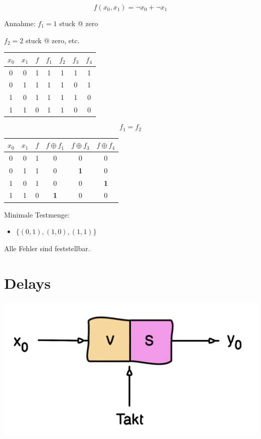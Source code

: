 \documentclass[a4paper,6pt]{article}
\begin{document}
\begin{multicols*}{3}
$$
f(x_0, x_1) = \neg x_0 + \neg x_1
$$

Annahme: \quad $f_{1} = 1$ stuck @ zero

\qquad \qquad \qquad $f_{2} = 2$ stuck @ zero, etc. 

\tiny
    \begin{center}
        \begin{tabular}{cc|c|cccc}
            \hline
            $x_0$ & $x_1$ & $f$ & $f_{1}$ & $f_{2}$ & $f_{3}$ & $f_{4}$  \\
            \hline
            0 & 0 & 1 & 1 & 1 & 1 & 1 \\
            0 & 1 & 1 & 1 & 1 & 0 & 1 \\
            1 & 0 & 1 & 1 & 1 & 1 & 0 \\
            1 & 1 & 0 & 1 & 1 & 0 & 0 \\
            \hline
        \end{tabular}
    \end{center}    
\scriptsize

$$
f_1 = f_2
$$

\tiny
    \begin{center}
        \begin{tabular}{cc|c|ccc}
            \hline
            $x_0$ & $x_1$ & $f$ & $f \oplus f_{1}$ & $f \oplus f_{3}$ & $f \oplus f_{4}$ \\
            \hline
            0 & 0 & 1 & 0 & 0 & 0 \\
            0 & 1 & 1 & 0 & \textbf{1} & 0 \\
            1 & 0 & 1 & 0 & 0 & \textbf{1} \\
            1 & 1 & 0 & \textbf{1} & 0 & 0 \\
            \hline
        \end{tabular}
    \end{center}    
\scriptsize

Minimale Testmenge:

\begin{itemize}
    \item $\{(0,1),(1,0),(1,1)\}$
\end{itemize}
Alle Fehler sind feststellbar.

\section{Delays}

\begin{center}
    \includegraphics[width=0.5\linewidth]{resources/Delay.png}
\end{center}


\end{multicols*}
\end{document}
